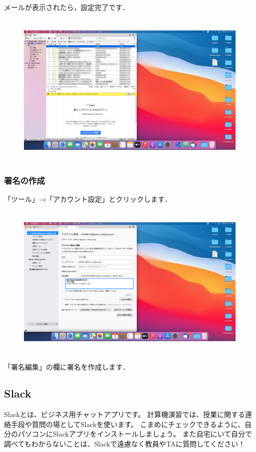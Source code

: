 \documentclass{jarticle}
\begin{document}
\newpage
メールが表示されたら，設定完了です．
\begin{figure}[H]
  \centering
  \includegraphics[height=7.5cm]{fig/MacThunderbird6.png}
\end{figure}

\subsubsection{署名の作成}
「ツール」→「アカウント設定」とクリックします．
\begin{figure}[H]
  \centering
  \includegraphics[height=7.5cm]{fig/MacThunderbird7.png}
\end{figure}
「署名編集」の欄に署名を作成します．

\subsection{Slack}
Slackとは、ビジネス用チャットアプリです。
計算機演習では、授業に関する連絡手段や質問の場としてSlackを使います。
こまめにチェックできるように、自分のパソコンにSlackアプリをインストールしましょう。
また自宅にいて自分で調べてもわからないことは、Slackで遠慮なく教員やTAに質問してください！
\end{document}
